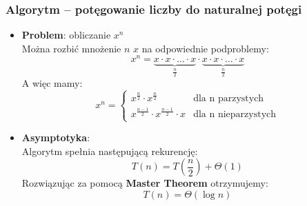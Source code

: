 \documentclass[11pt,a4paper]{article}
\begin{document}
\subsubsection{Algorytm -- potęgowanie liczby do naturalnej potęgi}
\begin{itemize}
    \item \textbf{Problem}: obliczanie $x^n$\\
        Można rozbić mnożenie $n$ $x$ na odpowiednie podproblemy:
        \[
            x^n = \underbrace{x \cdot x \cdot \dots \cdot x}_{\frac{n}{2}} \cdot \underbrace{x \cdot x \cdot \dots \cdot x}_{\frac{n}{2}}
        \]
        A więc mamy:
        \[
            x^n = \begin{cases}
                x^{\frac{n}{2}} \cdot x^{\frac{n}{2}} & \text{dla n parzystych} \\
                x^{\frac{n-1}{2}} \cdot x^{\frac{n-1}{2}} \cdot x & \text{dla n nieparzystych}
            \end{cases}
        \]
    \item \textbf{Asymptotyka}: \\
        Algorytm spełnia następującą rekurencję:
        \[
            T(n) = T(\frac{n}{2}) + \Theta(1)
        \]
        Rozwiązując za pomocą \textbf{Master Theorem} otrzymujemy:
        \[
            T(n) = \Theta(\log n)
        \]
\end{itemize}
\end{document}
